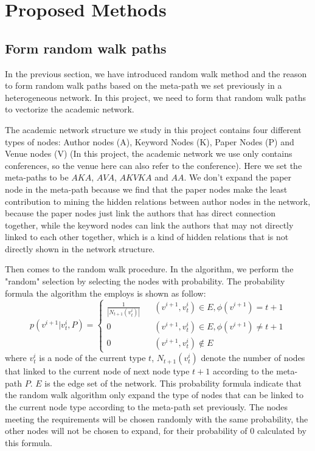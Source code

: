 \documentclass{acmtog} %
\begin{document}
\section{Proposed Methods}
\subsection{Form random walk paths}
In the previous section, we have introduced random walk method and the reason to form random walk paths based on the meta-path we set previously in a heterogeneous network. In this project, we need to form that random walk paths to vectorize the academic network.
\par The academic network structure we study in this project contains four different types of nodes: Author nodes (A), Keyword Nodes (K), Paper Nodes (P) and Venue nodes (V) (In this project, the academic network we use only contains conferences, so the venue here can also refer to the conference). Here we set the meta-paths to be $AKA$, $AVA$, $AKVKA$ and $AA$. We don't expand the paper node in the meta-path because we find that the paper nodes make the least contribution to mining the hidden relations between author nodes in the network, because the paper nodes just link the authors that has direct connection together, while the keyword nodes can link the authors that may not directly linked to each other together, which is a kind of hidden relations that is not directly shown in the network structure.
\par Then comes to the random walk procedure. In the algorithm, we perform the "random" selection by selecting the nodes with probability. The probability formula the algorithm the employs is shown as follow:
$$ p(v^{i+1}|v^i_t, P) = \left\{
\begin{array}{rcl}
\frac{1}{|N_{t+1}(v^i_t)|}&    &(v^{i+1}, v^i_t) \in E, \phi(v^{i+1}) = t+1\\
0&    &(v^{i+1}, v^i_t) \in E, \phi(v^{i+1}) \neq t+1\\
0&    &(v^{i+1}, v^i_t) \not\in E
\end{array}\right. $$
where $v^i_t$ is a node of the current type $t$, $N_{t+1}(v^i_t)$ denote the number of nodes that linked to the current node of next node type $t+1$ according to the meta-path $P$. $E$ is the edge set of the network. This probability formula indicate that the random walk algorithm only expand the type of nodes that can be linked to the current node type according to the meta-path set previously. The nodes meeting the requirements will be chosen randomly with the same probability, the other nodes will not be chosen to expand, for their probability of 0 calculated by this formula.
\end{document}

